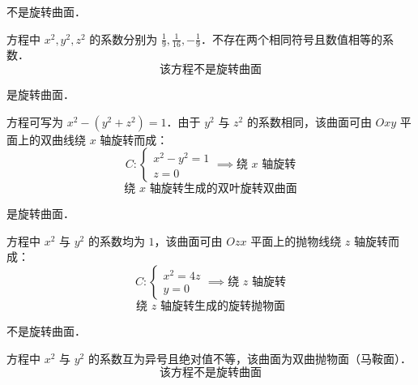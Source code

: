 \begin{solution}
     不是旋转曲面．

    方程中 $x^2, y^2, z^2$ 的系数分别为 $\frac{1}{9}, \frac{1}{16}, -\frac{1}{9}$．不存在两个相同符号且数值相等的系数．
    \begin{equation}
        \boxed{\text{该方程不是旋转曲面}}
    \end{equation}

     是旋转曲面．

    方程可写为 $x^2 - (y^2 + z^2) = 1$．由于 $y^2$ 与 $z^2$ 的系数相同，该曲面可由 $Oxy$ 平面上的双曲线绕 $x$ 轴旋转而成：
    \begin{equation}
        C: \begin{cases} x^2 - y^2 = 1 \\ z = 0 \end{cases} \implies \text{绕 } x \text{ 轴旋转}
    \end{equation}
    \begin{equation}
        \boxed{\text{绕 } x \text{ 轴旋转生成的双叶旋转双曲面}}
    \end{equation}

     是旋转曲面．

    方程中 $x^2$ 与 $y^2$ 的系数均为 $1$，该曲面可由 $Ozx$ 平面上的抛物线绕 $z$ 轴旋转而成：
    \begin{equation}
        C: \begin{cases} x^2 = 4z \\ y = 0 \end{cases} \implies \text{绕 } z \text{ 轴旋转}
    \end{equation}
    \begin{equation}
        \boxed{\text{绕 } z \text{ 轴旋转生成的旋转抛物面}}
    \end{equation}

     不是旋转曲面．

    方程中 $x^2$ 与 $y^2$ 的系数互为异号且绝对值不等，该曲面为双曲抛物面（马鞍面）．
    \begin{equation}
        \boxed{\text{该方程不是旋转曲面}}
    \end{equation}
\end{solution}



